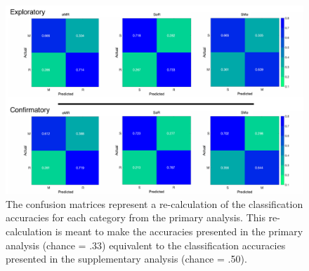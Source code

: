 \documentclass[
  english,
  man, donotrepeattitle,floatsintext]{apa6}
\begin{document}
\begin{figure}
\centering
\includegraphics{figures/supp_analysis/recalculations/confusion_matrices/recalc_conf_matrices.pdf}
\caption{\label{fig:recalc-conf-matrices}The confusion matrices represent a re-calculation of the classification accuracies for each category from the primary analysis. This re-calculation is meant to make the accuracies presented in the primary analysis (chance = .33) equivalent to the classification accuracies presented in the supplementary analysis (chance = .50).}
\end{figure}
\end{document}
